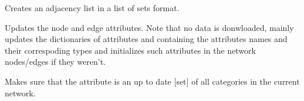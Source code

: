 \documentclass[letterpaper,10pt,english]{sphinxmanual}
\begin{document}
\begin{fulllineitems}

\begin{fulllineitems}
\label{\detokenize{main:pypath.main.PyPath.up_stimulated_by}}
\end{fulllineitems}


\begin{fulllineitems}
\label{\detokenize{main:pypath.main.PyPath.up_stimulates}}
\end{fulllineitems}


\begin{fulllineitems}
\label{\detokenize{main:pypath.main.PyPath.update_adjlist}}
Creates an adjacency list in a list of sets format.

\end{fulllineitems}


\begin{fulllineitems}
\label{\detokenize{main:pypath.main.PyPath.update_attrs}}
Updates the node and edge attributes. Note that no data is
donwloaded, mainly updates the dictionaries of attributes
 and
 containing the
attributes names and their correspoding types and initializes
such attributes in the network nodes/edges if they weren’t.

\end{fulllineitems}


\begin{fulllineitems}
\label{\detokenize{main:pypath.main.PyPath.update_cats}}
Makes sure that the 
attribute is an up to date {[}set{]} of all categories in the
current network.


\end{fulllineitems}
\end{fulllineitems}
\end{document}
